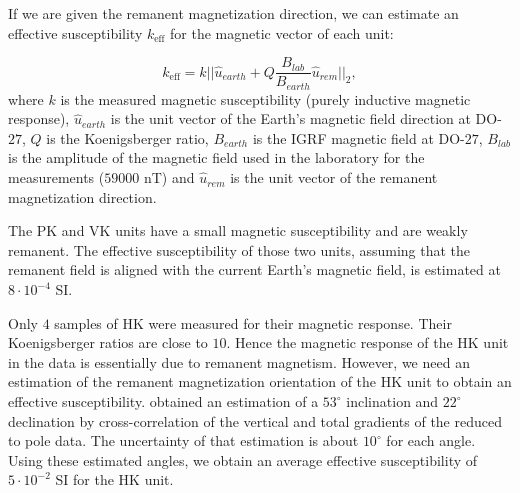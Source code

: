 \documentclass[paper, twocolumn]{geophysics} %
\begin{document}
If we are given the remanent magnetization direction, we can estimate an effective susceptibility $k_\text{eff}$ for the magnetic vector of each unit:

\begin{equation}
k_\text{eff} = k||\hat{u}_{earth}+Q \frac{{B}_{lab}}{{B}_{earth}}\hat{u}_{rem}||_2,
\end{equation}
where $k$ is the measured magnetic susceptibility (purely inductive magnetic response), $\hat{u}_{earth}$ is the unit vector of the Earth's magnetic field direction at DO-$27$, $Q$ is the Koenigsberger ratio, $B_{earth}$ is the IGRF magnetic field at DO-$27$, ${B}_{lab}$ is the amplitude of the magnetic field used in the laboratory for the measurements ($59000$ nT) and $\hat{u}_{rem}$ is the unit vector of the remanent magnetization direction.

The PK and VK units have a small magnetic susceptibility and are weakly remanent. The effective susceptibility of those two units, assuming that the remanent field is aligned with the current Earth's magnetic field, is estimated at $8 \cdot 10^{-4}$ SI.

Only $4$ samples of HK were measured for their magnetic response. Their Koenigsberger ratios are close to $10$. Hence the magnetic response of the HK unit in the data is essentially due to remanent magnetism. However, we need an estimation of the remanent magnetization orientation of the HK unit to obtain an effective susceptibility. \citet{TKCpaper} obtained an estimation of a $53^{\circ}$ inclination and $22^{\circ}$ declination by cross-correlation of the vertical and total gradients of the reduced to pole data. The uncertainty of that estimation is about $10^{\circ}$ for each angle. Using these estimated angles, we obtain an average effective susceptibility of $5 \cdot 10^{-2}$ SI for the HK unit.


\end{document}
